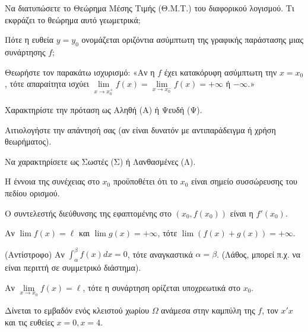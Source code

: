 \documentclass[11pt,a4paper]{article}
\newcommand{\kerkissans}[1]{{\fontfamily{maksf}\selectfont \textbf{#1}}}
\newcommand{\dint}{\displaystyle\int}
\newcommand\themanum{A}
\newcounter{thema}[section]
\renewcommand{\thethema}{\arabic{thema}}
\newcommand{\Thema}{\refstepcounter{thema}{\textbf{\textcolor{black}{\faPenSquare\ \  \large \kerkissans{\textbf{\thethemaο\hspace{2mm}Διαγώνισμα - Θέμα \themanum}}}}}\hspace{0mm}}{}
\newenvironment{thema}[1]
{\begin{tcolorbox}[title=\Thema\kerkissans{\textbf{\large{  #1}}},breakable,
enhanced standard,titlerule=0pt,toprule=0pt, rightrule=0pt, bottomrule=0pt,
colback=white,left=0mm,top=1mm,bottom=0mm,
boxrule=0pt,
colframe=white,leftrule=0mm,sharp corners,coltitle=black]
\renewcommand{\themanum}{#1}}
{\end{tcolorbox}}
\begin{document}
\begin{thema}{A}
\begin{erwthma}
    \item Να διατυπώσετε το Θεώρημα Μέσης Τιμής (Θ.Μ.Τ.) του διαφορικού λογισμού. Τι εκφράζει το θεώρημα αυτό γεωμετρικά;
    \item Πότε η ευθεία $y=y_0$ ονομάζεται οριζόντια ασύμπτωτη της γραφικής παράστασης μιας συνάρτησης $f$;
    \item Θεωρήστε τον παρακάτω ισχυρισμό:
    «Αν η $f$ έχει κατακόρυφη ασύμπτωτη την $x=x_0$, τότε απαραίτητα ισχύει $\lim\limits_{x\to x_0^+}f(x) = \lim\limits_{x\to x_0^-}f(x) = +\infty$ ή $-\infty$.»
    \begin{alist}
    \item Χαρακτηρίστε την πρόταση ως Αληθή (Α) ή Ψευδή (Ψ).
    \item Αιτιολογήστε την απάντησή σας (αν είναι δυνατόν με αντιπαράδειγμα ή χρήση θεωρήματος).
    \end{alist}
    \item Να χαρακτηρίσετε ως Σωστές (Σ) ή Λανθασμένες (Λ).
    \begin{alist}
        \item Η έννοια της συνέχειας στο $x_0$ προϋποθέτει ότι το $x_0$ είναι σημείο συσσώρευσης του πεδίου ορισμού.
        \item Ο συντελεστής διεύθυνσης της εφαπτομένης στο $(x_0, f(x_0))$ είναι η $f'(x_0)$.
        \item Αν $\lim f(x) = \ell$ και $\lim g(x) = +\infty$, τότε $\lim (f(x)+g(x)) = +\infty$.
        \item (Αντίστροφο) Αν $\dint_\alpha^\beta f(x)dx = 0$, τότε αναγκαστικά $\alpha = \beta$. (Λάθος, μπορεί π.χ. να είναι περιττή σε συμμετρικό διάστημα).
        \item Αν $\lim\limits_{x\to x_0} f(x) = \ell$, τότε η συνάρτηση ορίζεται υποχρεωτικά στο $x_0$.
    \end{alist}
    \item Δίνεται το εμβαδόν ενός κλειστού χωρίου $\Omega$ ανάμεσα στην καμπύλη της $f$, τον $x'x$ και τις ευθείες $x=0, x=4$.
    \begin{center}
\end{center}
\end{erwthma}
\end{thema}
\end{document}
